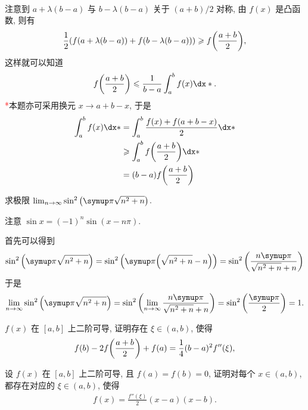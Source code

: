 \begin{exercise}[series=exer]
\begin{answer}
\begin{align*}
      \end{align*}
      注意到 $ a + \lambda(b - a) $ 与 $ b - \lambda(b - a) $ 关于 $ (a + b)/2 $ 对称, 由 $ f(x) $ 是凸函数, 则有
      \begin{align*}
          \frac{1}{2}(f(a + \lambda(b - a)) + f(b - \lambda(b - a))) \geqslant f\qty(\frac{a + b}{2}),
      \end{align*}
      这样就可以知道
      \begin{align*}
          f\qty(\frac{a + b}{2}) \le \frac{1}{b - a} \int_{a}^{b} f(x) \dx*.
      \end{align*}
      \textcolor{red}{*}本题亦可采用换元 $x \to a+b-x$, 于是
      \begin{align*}
        \int_{a}^{b} f(x) \dx* &= \int_{a}^{b} \frac{f(x)+f(a+b-x)}{2} \dx* \\
        &\ge \int_{a}^{b} f\qty(\frac{a+b}{2}) \dx*\\
        &=(b-a) f\qty(\frac{a+b}{2})
      \end{align*}
  \end{answer}
  \item 求极限 $ \limit{n}{\infty} \sin^{2}\qty(\pi \sqrt{n^{2} + n}) $.
  \begin{hint}
      注意 $ \sin x = (-1)^n \sin (x - n \pi) $.
  \end{hint}
  \begin{answer}
      首先可以得到
      \begin{align*}
          \sin^{2}\qty(\pi \sqrt{n^{2} + n}) = \sin^{2}\qty(\pi \qty(\sqrt{n^{2} + n} - n)) = \sin^{2}\qty(\frac{n\pi}{\sqrt{n^{2} + n} + n})
      \end{align*}
      于是
      \begin{align*}
          \limit{n}{\infty}\sin^{2}\qty(\pi \sqrt{n^{2} + n}) = \sin^{2}\qty(\limit{n}{\infty}\frac{n\pi}{\sqrt{n^{2} + n} + n}) = \sin^{2}\qty(\frac{\pi}{2}) = 1.
      \end{align*}
  \end{answer}
  \item $ f(x) $ 在 $ [a, b] $ 上二阶可导, 证明存在 $ \xi \in (a, b) $, 使得
  \begin{align*}
      f(b) - 2f\qty(\frac{a + b}{2}) + f(a) = \frac{1}{4} (b - a)^{2} f''(\xi),
  \end{align*}
  \item 设 $ f(x) $ 在 $ [a, b] $ 上二阶可导, 且 $ f(a) = f(b)  = 0 $, 证明对每个 $ x \in (a, b) $, 都存在对应的 $ \xi \in (a, b) $, 使得
  \begin{align*}
      f(x) = \frac{f''(\xi)}{2} (x - a) (x - b).

\end{align*}
\end{exercise}
